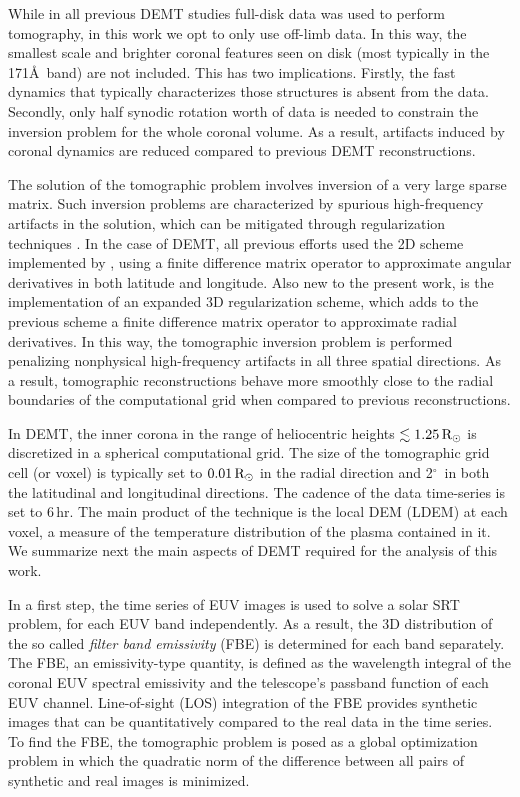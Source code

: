 \documentclass[namedreferences]{solarphysics}
\renewcommand{\deg}{$^\circ$}
\newcommand{\mrsun}{{\rm R_\odot}}
\begin{document}
\begin{article}
{While in all previous DEMT studies full-disk data was used to perform tomography, in this work we {opt} to only use off-limb data. In this way, the smallest scale and brighter coronal features seen on disk (most typically in the 171\AA\ band) are not included. This has two implications. Firstly, the fast dynamics that typically characterizes those structures is absent from the data. Secondly, only half synodic rotation worth of data is needed to constrain the inversion problem for the whole coronal volume. As a result, {artifacts induced by coronal dynamics} are reduced compared to previous DEMT reconstructions.}

{The solution of the tomographic problem involves {inversion of} a very large sparse matrix. Such inversion problems are characterized by spurious {high-frequency} artifacts in the solution, which can be mitigated through {regularization} techniques \citep{frazin_2000}. In the case of DEMT, all previous efforts used the 2D scheme implemented by \citet{frazin_2009}, using a finite difference matrix operator to approximate angular derivatives in both latitude and longitude. Also new to the present work, is the implementation of an expanded 3D regularization scheme, which adds to the previous scheme a finite difference matrix operator to approximate radial derivatives. In this way, the tomographic inversion problem is performed penalizing nonphysical high-frequency artifacts in all three spatial directions. As a result, tomographic reconstructions behave more smoothly close to the radial boundaries of the computational grid {when compared to previous reconstructions.}}

{In DEMT, the inner corona in the range of heliocentric heights $\lesssim 1.25\,\mrsun$ is discretized in a spherical computational grid. The size of the tomographic grid cell (or voxel) is typically set to $0.01\,\mrsun$ in the radial direction and 2\deg\ in both the latitudinal and longitudinal directions. The cadence of the data time-series is set to 6\,hr. The main product of the technique is the local DEM (LDEM) at each voxel, a measure of the temperature distribution of the plasma contained in it. We summarize next the main aspects of DEMT required for the analysis of this work.}

In a first step, the time series of EUV images is used to solve a solar SRT problem, for each EUV band independently. As a result, the 3D distribution of the so called \emph{filter band emissivity} (FBE) is determined for each band separately. The FBE, {an emissivity-type quantity}, is defined as the wavelength integral of the coronal EUV spectral emissivity and the telescope's passband function of each EUV channel. Line-of-sight (LOS) integration of the FBE provides synthetic images that can be quantitatively compared to the real data in the time series. To find the FBE, the tomographic problem is posed as a global optimization problem in which the quadratic norm of the difference between all {pairs of synthetic and real images is minimized.}


\end{article}
\end{document}
